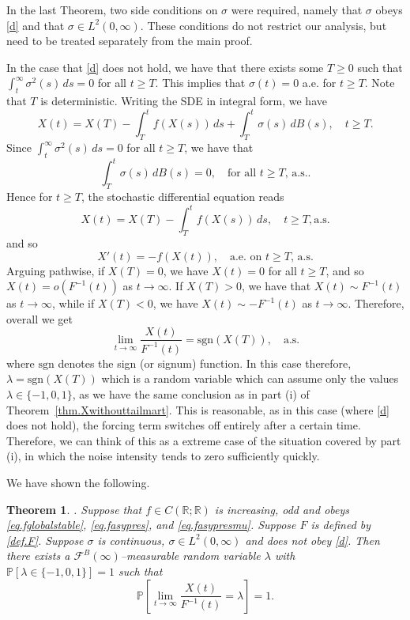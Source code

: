 \documentclass[a4paper,10pt,reqno]{amsart}
\numberwithin{equation}{section}
\newtheorem{theorem}{Theorem}
\theoremstyle{definition}
\theoremstyle{remark}
\DeclareMathOperator{\1}{\mathbbm 1}
\begin{document}
	In the last Theorem, two side conditions on $\sigma$ were required, namely that $\sigma$ obeys \eqref{d} and that $\sigma\in L^2(0,\infty)$. These conditions do not restrict our analysis, but need to be treated separately from the main proof. 
	
	In the case that \eqref{d} does not hold, we have that there exists some $T\geq 0$ such that $\int_t^\infty \sigma^2(s)\,ds =0$ for all $t\geq T$. This implies that $\sigma(t)=0$ a.e. for $t\geq T$. 
	Note that $T$ is deterministic. Writing the SDE in integral form, we have 
	\[
	X(t)=X(T)-\int_T^t f(X(s))\,ds + \int_T^t \sigma(s)\,dB(s), \quad t\geq T.
	\]
	Since $\int_t^\infty \sigma^2(s)\,ds=0$ for all $t\geq T$,  we have that 
	\[
	\int_T^t \sigma(s)\,dB(s) = 0, \quad \text{for all $t\geq T$, a.s.}.
	\] 
	Hence for $t\geq T$, the stochastic differential equation reads
	\[
	X(t)=X(T)-\int_T^t f(X(s))\,ds, \quad t\geq T, \text{a.s.}
	\] 
	and so 
	\[
	X'(t)=-f(X(t)), \quad \text{a.e. on $t\geq T$, a.s.} 
	\]  
	Arguing pathwise, if $X(T)=0$, we have $X(t)=0$ for all $t\geq T$, and so $X(t)=o(F^{-1}(t))$ as $t\to\infty$. If $X(T)>0$, we have that $X(t)\sim F^{-1}(t)$ as $t\to\infty$, while if $X(T)<0$, we have $X(t)\sim -F^{-1}(t)$ as $t\to\infty$. Therefore, overall we get 
	\[
	\lim_{t\to\infty} \frac{X(t)}{F^{-1}(t)}=\text{sgn}(X(T)), \quad \text{a.s.}
	\]
	where $\text{sgn}$ denotes the sign (or signum) function. In this case therefore, $\lambda=\text{sgn}(X(T))$ which is a random variable which can assume only the values $\lambda\in \{-1,0,1\}$, as we have the same conclusion as in part (i) of Theorem~\ref{thm.Xwithouttailmart}. This is reasonable, as in this case (where \eqref{d} does not hold), the forcing term switches off entirely after a certain time. Therefore, we can think of this as a extreme case of the situation covered by part (i), in which the noise intensity tends to zero sufficiently quickly. 
	
	We have shown the following.
	
	\begin{theorem}
		\label{thm.Xwithouttailmart1}.
		Suppose that $f\in C(\mathbb{R};\mathbb{R})$ is increasing, odd and obeys \eqref{eq.fglobalstable}, \eqref{eq.fasypres}, and \eqref{eq.fasypresmu}. Suppose $F$ is defined by \eqref{def.F}. 
		Suppose $\sigma$ is continuous, $\sigma \in L^2(0,\infty)$ and does not obey \eqref{d}. 
		Then there exists a $\mathcal{F}^B(\infty)$--measurable random variable $\lambda$ with $\mathbb{P}[\lambda\in \{-1,0,1\}]=1$ such that 
		\[
		\mathbb{P}\left[ \lim_{t \to \infty} \frac{X(t)}{F^{-1}(t)} =\lambda \right] = 1.
		\]
	\end{theorem}
	
\end{document}
